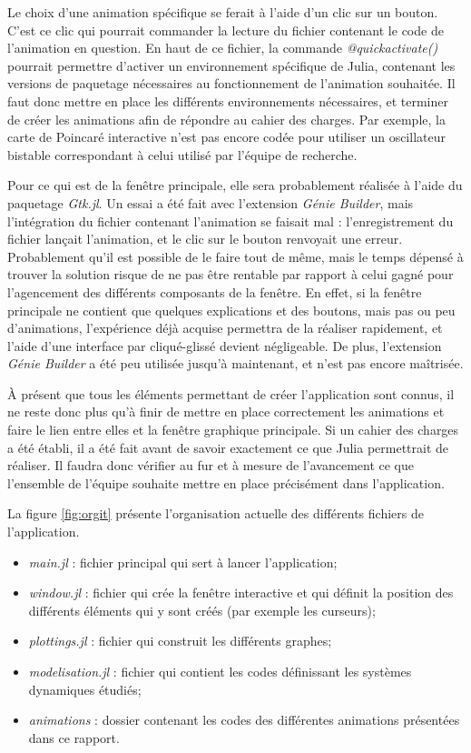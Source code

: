 \documentclass[a4paper, french, 12pt, titlepage]{article}
\begin{document}
Le choix d'une animation spécifique se ferait à l'aide d'un clic sur un bouton.
C'est ce clic qui pourrait commander la lecture du fichier contenant le code de l'animation en question.
En haut de ce fichier, la commande \emph{@quickactivate()} pourrait permettre d'activer un environnement spécifique de Julia, contenant les versions de paquetage nécessaires au fonctionnement de l'animation souhaitée.
Il faut donc mettre en place les différents environnements nécessaires, et terminer de créer les animations afin de répondre au cahier des charges.
Par exemple, la carte de Poincaré interactive n'est pas encore codée pour utiliser un oscillateur bistable correspondant à celui utilisé par l'équipe de recherche. 

Pour ce qui est de la fenêtre principale, elle sera probablement réalisée à l'aide du paquetage \emph{Gtk.jl}.
Un essai a été fait avec l'extension \emph{Génie Builder}, mais l'intégration du fichier contenant l'animation se faisait mal : l'enregistrement du fichier lançait l'animation, et le clic sur le bouton renvoyait une erreur.
Probablement qu'il est possible de le faire tout de même, mais le temps dépensé à trouver la solution risque de ne pas être rentable par rapport à celui gagné pour l'agencement des différents composants de la fenêtre.
En effet, si la fenêtre principale ne contient que quelques explications et des boutons, mais pas ou peu d'animations, l'expérience déjà acquise permettra de la réaliser rapidement, et l'aide d'une interface par cliqué-glissé devient négligeable.
De plus, l'extension \emph{Génie Builder} a été peu utilisée jusqu'à maintenant, et n'est pas encore maîtrisée. 

À présent que tous les éléments permettant de créer l'application sont connus, il ne reste donc plus qu'à finir de mettre en place correctement les animations et faire le lien entre elles et la fenêtre graphique principale.
Si un cahier des charges a été établi, il a été fait avant de savoir exactement ce que Julia permettrait de réaliser.
Il faudra donc vérifier au fur et à mesure de l'avancement ce que l'ensemble de l'équipe souhaite mettre en place précisément dans l'application.


La figure \ref{fig:orgit} présente l'organisation actuelle des différents fichiers de l'application.\\


\begin{itemize}
  \item \emph{main.jl} : fichier principal qui sert à lancer l'application;
  \item \emph{window.jl} : fichier qui crée la fenêtre interactive et qui définit la position des différents éléments qui y sont créés (par exemple les curseurs);
  \item \emph{plottings.jl} : fichier qui construit les différents graphes;
  \item \emph{modelisation.jl} : fichier qui contient les codes définissant les systèmes dynamiques étudiés;
  \item \emph{animations} : dossier contenant les codes des différentes animations présentées dans ce rapport.
\end{itemize}
\end{document}
